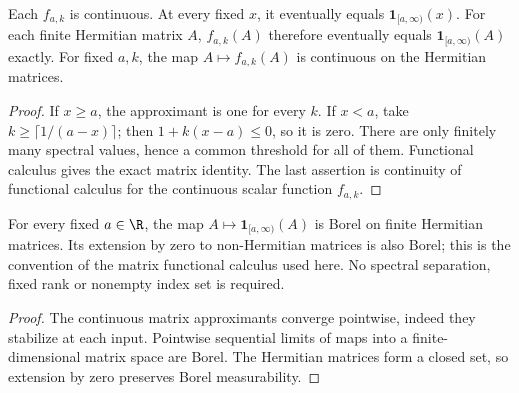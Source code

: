 \begin{lemma}
    \label{lem:closed_threshold_finite_stabilization}
    \leanok
    Each $f_{a,k}$ is continuous. At every fixed $x$, it eventually equals
    $\mathbf1_{[a,\infty)}(x)$. For each finite Hermitian matrix $A$,
    $f_{a,k}(A)$ therefore eventually equals
    $\mathbf1_{[a,\infty)}(A)$ exactly. For fixed $a,k$, the map
    $A\mapsto f_{a,k}(A)$ is continuous on the Hermitian matrices.
\end{lemma}
\begin{proof}\leanok
    If $x\ge a$, the approximant is one for every $k$. If $x<a$, take
    $k\ge\lceil1/(a-x)\rceil$; then $1+k(x-a)\le0$, so it is zero.
    There are only finitely many spectral values, hence a common threshold
    for all of them. Functional calculus gives the exact matrix identity.
    The last assertion is continuity of functional calculus for the
    continuous scalar function $f_{a,k}$.
\end{proof}

\begin{lemma}
    \label{lem:borel_closed_spectral_cutoff}
    \leanok
    For every fixed $a\in\R$, the map
    $A\mapsto\mathbf1_{[a,\infty)}(A)$ is Borel on finite Hermitian matrices.
    Its extension by zero to non-Hermitian matrices is also Borel; this is
    the convention of the matrix functional calculus used here.
    No spectral separation, fixed rank or nonempty index set is required.
\end{lemma}
\begin{proof}\leanok
    The continuous matrix approximants converge pointwise, indeed they
    stabilize at each input. Pointwise sequential limits of maps into a
    finite-dimensional matrix space are Borel. The Hermitian matrices
    form a closed set, so extension by zero preserves Borel measurability.
\end{proof}

